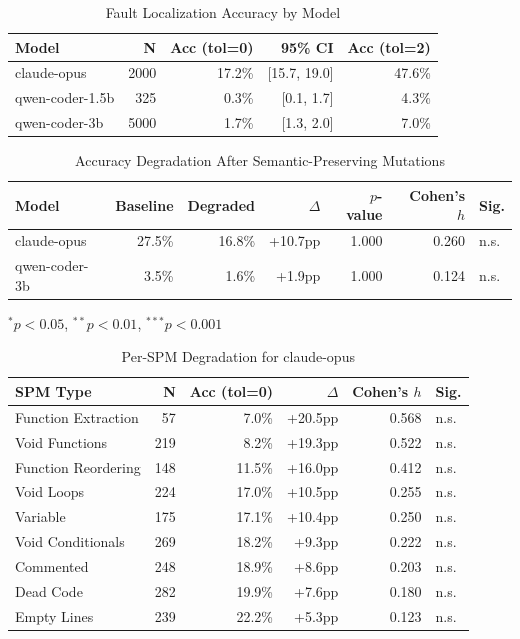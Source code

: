 \begin{table}[h]
\centering
\caption{Fault Localization Accuracy by Model}
\label{tab:overall_accuracy}
\begin{tabular}{lrrrr}
\toprule
Model & N & Acc (tol=0) & 95\% CI & Acc (tol=2) \\
\midrule
claude-opus & 2000 & 17.2\% & [15.7, 19.0] & 47.6\% \\
qwen-coder-1.5b & 325 & 0.3\% & [0.1, 1.7] & 4.3\% \\
qwen-coder-3b & 5000 & 1.7\% & [1.3, 2.0] & 7.0\% \\
\bottomrule
\end{tabular}
\end{table}

\begin{table}[h]
\centering
\caption{Accuracy Degradation After Semantic-Preserving Mutations}
\label{tab:degradation}
\begin{tabular}{lrrrrrl}
\toprule
Model & Baseline & Degraded & $\Delta$ & $p$-value & Cohen's $h$ & Sig. \\
\midrule
claude-opus & 27.5\% & 16.8\% & +10.7pp & 1.000 & 0.260 & n.s. \\
qwen-coder-3b & 3.5\% & 1.6\% & +1.9pp & 1.000 & 0.124 & n.s. \\
\bottomrule
\end{tabular}
\vspace{2mm}
\footnotesize{$^{*}p<0.05$, $^{**}p<0.01$, $^{***}p<0.001$}
\end{table}

\begin{table}[h]
\centering
\caption{Per-SPM Degradation for claude-opus}
\label{tab:per_spm_claude-opus}
\begin{tabular}{lrrrrl}
\toprule
SPM Type & N & Acc (tol=0) & $\Delta$ & Cohen's $h$ & Sig. \\
\midrule
Function Extraction & 57 & 7.0\% & +20.5pp & 0.568 & n.s. \\
Void Functions & 219 & 8.2\% & +19.3pp & 0.522 & n.s. \\
Function Reordering & 148 & 11.5\% & +16.0pp & 0.412 & n.s. \\
Void Loops & 224 & 17.0\% & +10.5pp & 0.255 & n.s. \\
Variable & 175 & 17.1\% & +10.4pp & 0.250 & n.s. \\
Void Conditionals & 269 & 18.2\% & +9.3pp & 0.222 & n.s. \\
Commented & 248 & 18.9\% & +8.6pp & 0.203 & n.s. \\
Dead Code & 282 & 19.9\% & +7.6pp & 0.180 & n.s. \\
Empty Lines & 239 & 22.2\% & +5.3pp & 0.123 & n.s. \\
\bottomrule
\end{tabular}
\end{table}

